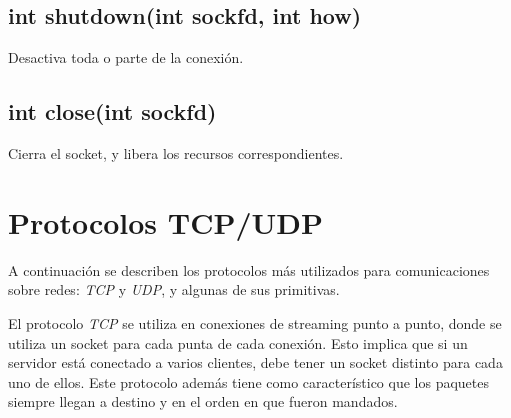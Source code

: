 \documentclass[oneside]{article}
\numberwithin{equation}{section}
\numberwithin{figure}{section}
\numberwithin{table}{section}
\begin{document}
		\subsection{int shutdown(int sockfd, int how)}
		Desactiva toda o parte de la conexión.\\

		\subsection{int close(int sockfd)}
		Cierra el socket, y libera los recursos correspondientes.\\

	\section{Protocolos TCP/UDP}
		
		A continuación se describen los protocolos más utilizados para comunicaciones sobre redes: \emph{TCP} y \emph{UDP}, y algunas de sus primitivas.
		
		El protocolo \emph{TCP} se utiliza en conexiones de streaming punto a punto, donde se utiliza un socket para cada punta de cada conexión. Esto implica que si un servidor está conectado a varios clientes, debe tener un socket distinto para cada uno de ellos. Este protocolo además tiene como característico que los paquetes siempre llegan a destino y en el orden en que fueron mandados.
		
\end{document}
